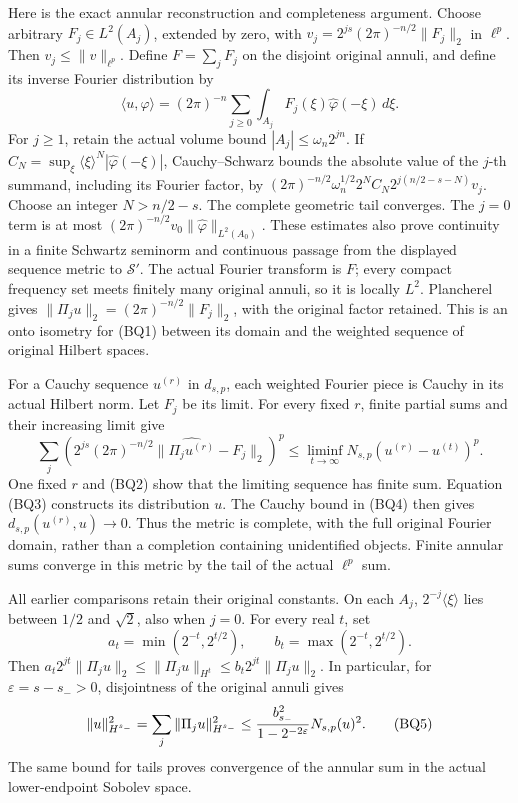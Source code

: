 \documentclass[
  11pt,
]{article}
\begin{document}
Here is the exact annular reconstruction and completeness argument.
Choose arbitrary \(F_j\in L^2(A_j)\), extended by zero, with
\(v_j=2^{js}(2\pi)^{-n/2}\|F_j\|_2\) in \(\ell^p\). Then
\(v_j\le\|v\|_{\ell^p}\). Define \(F=\sum_jF_j\) on the disjoint
original annuli, and define its inverse Fourier distribution by \[
\langle u,\varphi\rangle=(2\pi)^{-n}\sum_{j\ge0}
       \int_{A_j}F_j(\xi)\widehat\varphi(-\xi)\,d\xi.
\tag{BQ3}
\] For \(j\ge1\), retain the actual volume bound
\(|A_j|\le\omega_n2^{jn}\). If
\(C_N=\sup_\xi\langle\xi\rangle^N|\widehat\varphi(-\xi)|\),
Cauchy--Schwarz bounds the absolute value of the \(j\)-th summand,
including its Fourier factor, by
\((2\pi)^{-n/2}\omega_n^{1/2}2^NC_N2^{j(n/2-s-N)}v_j\). Choose an
integer \(N>n/2-s\). The complete geometric tail converges. The \(j=0\)
term is at most \((2\pi)^{-n/2}v_0\|\widehat\varphi\|_{L^2(A_0)}\).
These estimates also prove continuity in a finite Schwartz seminorm and
continuous passage from the displayed sequence metric to
\(\mathcal S'\). The actual Fourier transform is \(F\); every compact
frequency set meets finitely many original annuli, so it is locally
\(L^2\). Plancherel gives \(\|\Pi_ju\|_2=(2\pi)^{-n/2}\|F_j\|_2\), with
the original factor retained. This is an onto isometry for (BQ1) between
its domain and the weighted sequence of original Hilbert spaces.

For a Cauchy sequence \(u^{(r)}\) in \(d_{s,p}\), each weighted Fourier
piece is Cauchy in its actual Hilbert norm. Let \(F_j\) be its limit.
For every fixed \(r\), finite partial sums and their increasing limit
give \[
\sum_j\left(2^{js}(2\pi)^{-n/2}
       \|\widehat{\Pi_ju^{(r)}}-F_j\|_2\right)^p
\le\liminf_{t\to\infty}N_{s,p}(u^{(r)}-u^{(t)})^p.
\tag{BQ4}
\] One fixed \(r\) and (BQ2) show that the limiting sequence has finite
sum. Equation (BQ3) constructs its distribution \(u\). The Cauchy bound
in (BQ4) then gives \(d_{s,p}(u^{(r)},u)\to0\). Thus the metric is
complete, with the full original Fourier domain, rather than a
completion containing unidentified objects. Finite annular sums converge
in this metric by the tail of the actual \(\ell^p\) sum.

All earlier comparisons retain their original constants. On each
\(A_j\), \(2^{-j}\langle\xi\rangle\) lies between \(1/2\) and
\(\sqrt2\), also when \(j=0\). For every real \(t\), set \[
a_t=\min(2^{-t},2^{t/2}),\qquad b_t=\max(2^{-t},2^{t/2}).
\] Then
\(a_t2^{jt}\|\Pi_ju\|_2\le\|\Pi_ju\|_{H^t}\le b_t2^{jt}\|\Pi_ju\|_2\).
In particular, for \(\varepsilon=s-s_->0\), disjointness of the original
annuli gives \[
\|u\|_{H^{s_-}}^2
 =\sum_j\|\Pi_ju\|_{H^{s_-}}^2
 \le {b_{s_-}^2\over1-2^{-2\varepsilon}}N_{s,p}(u)^2.
\tag{BQ5}
\] The same bound for tails proves convergence of the annular sum in the
actual lower-endpoint Sobolev space.
\end{document}

